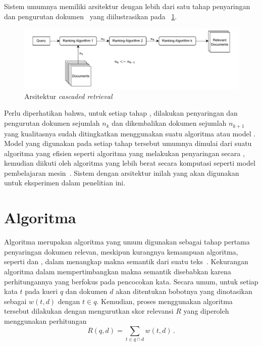 Sistem \ir{} umumnya memiliki arsitektur \cascaded{} dengan lebih dari satu tahap penyaringan dan pengurutan dokumen~\citep{wang2011cascade, nguyen2024captain} yang diilustrasikan pada \gambar{}~\ref{fig:ilustrasi cascade retr}. 
\begin{figure}[!ht]
    \centering
    \includegraphics[scale=0.75]{assets/pdfs/CascadeRetrieval.drawio.pdf}
    \caption{Arsitektur \textit{cascaded retrieval}}
    \label{fig:ilustrasi cascade retr}
\end{figure}
Perlu diperhatikan bahwa, untuk setiap tahap \ranking{}, dilakukan penyaringan dan pengurutan dokumen sejumlah \(n_k\) dan dikembalikan dokumen sejumlah \(n_{k+1}\) yang kualitasnya sudah ditingkatkan menggunakan suatu algoritma atau model \ranking{}. Model yang digunakan pada setiap tahap tersebut umumnya dimulai dari suatu algoritma yang efisien seperti algoritma \txt{} \matching{} yang melakukan penyaringan secara \heuristic{}, kemudian diikuti oleh algoritma yang lebih berat secara komputasi seperti model pembelajaran mesin~\citep{zhan2020learning, nguyen2024captain}. Sistem \ir{} dengan arsitektur \cascaded{} inilah yang akan digunakan untuk eksperimen dalam penelitian ini.





\section{Algoritma \Txt{} \Matching{}}
\label{subbab:2:Algoritma Text Matching}
Algoritma \txt{} \matching{} merupakan algoritma yang umum digunakan sebagai tahap pertama penyaringan dokumen relevan, meskipun kurangnya kemampuan algoritma, seperti \obm{} dan \tfidf{}, dalam menangkap makna semantik dari suatu teks~\citep{zhan2020learning}. Kekurangan algoritma dalam mempertimbangkan makna semantik disebabkan karena perhitungannya yang berfokus pada pencocokan kata. Secara umum, untuk setiap kata \(t\) pada kueri \(q\) dan dokumen \(d\) akan ditentukan bobotnya yang dinotasikan sebagai \(w(t,d)\) dengan \(t\in{}q\). Kemudian, proses \ranking{} menggunakan algoritma tersebut dilakukan dengan mengurutkan skor relevansi \(R\) yang diperoleh menggunakan perhitungan \[
R(q,d)=\sum_{t\in{}q\cap{}d}w(t,d) \, .
\]

